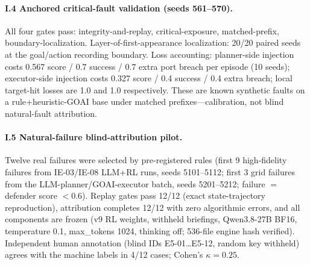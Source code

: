 \documentclass[sigconf,anonymous]{aamas}
\begin{document}


\paragraph{I.4 Anchored critical-fault validation (seeds 561--570).}
All four gates pass: integrity-and-replay, critical-exposure, matched-prefix, boundary-localization. Layer-of-first-appearance localization: 20/20 paired seeds at the goal/action recording boundary. Loss accounting: planner-side injection costs 0.567 score / 0.7 success / 0.7 extra port breach per episode (10 seeds); executor-side injection costs 0.327 score / 0.4 success / 0.4 extra breach; local target-hit losses are 1.0 and 1.0 respectively. These are known synthetic faults on a rule+heuristic-GOAI base under matched prefixes---calibration, not blind natural-fault attribution.

\paragraph{I.5 Natural-failure blind-attribution pilot.}
Twelve real failures were selected by pre-registered rules (first 9 high-fidelity failures from IE-03/IE-08 LLM+RL runs, seeds 5101--5112; first 3 grid failures from the LLM-planner/GOAI-executor batch, seeds 5201--5212; failure $=$ defender score $<0.6$). Replay gates pass 12/12 (exact state-trajectory reproduction), attribution completes 12/12 with zero algorithmic errors, and all components are frozen (v9 RL weights, withheld briefings, Qwen3.8-27B BF16, temperature 0.1, max\_tokens 1024, thinking off; 536-file engine hash verified). Independent human annotation (blind IDs E5-01\ldots E5-12, random key withheld) agrees with the machine labels in 4/12 cases; Cohen's $\kappa = 0.25$.
\end{document}
